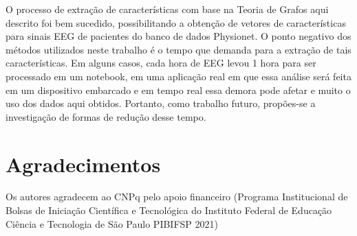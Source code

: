 \documentclass[a4paper,11pt]{article} %
\begin{document}
O processo de extração de características com base na Teoria de Grafos aqui descrito foi bem sucedido, possibilitando a obtenção de vetores de características para sinais EEG de pacientes do banco de dados Physionet. O ponto negativo dos métodos utilizados neste trabalho é o tempo que demanda para a extração de tais características. Em alguns casos, cada hora de EEG levou 1 hora para ser processado em um notebook, em uma aplicação real em que essa análise será feita em um dispositivo embarcado e em tempo real essa demora pode afetar e muito o uso dos dados aqui obtidos. Portanto, como trabalho futuro, propões-se a investigação de formas de redução desse tempo.

\section*{Agradecimentos}

Os autores agradecem ao CNPq pelo apoio financeiro (Programa Institucional de Bolsas de Iniciação Científica e Tecnológica do Instituto Federal de Educação Ciência e Tecnologia de São Paulo PIBIFSP 2021)


\end{document}
